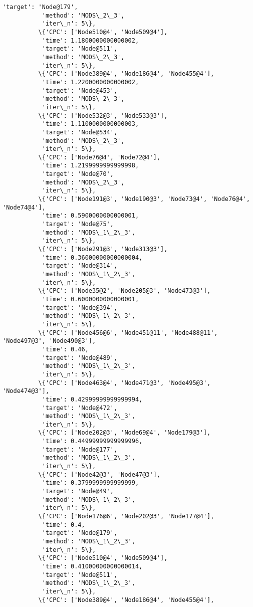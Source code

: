 \documentclass[11pt]{article}
\begin{document}
\begin{Verbatim}[commandchars=\\\{\}]
           'target': 'Node@179',
           'method': 'MODS\_2\_3',
           'iter\_n': 5\},
          \{'CPC': ['Node510@4', 'Node509@4'],
           'time': 1.1800000000000002,
           'target': 'Node@511',
           'method': 'MODS\_2\_3',
           'iter\_n': 5\},
          \{'CPC': ['Node389@4', 'Node186@4', 'Node455@4'],
           'time': 1.2200000000000002,
           'target': 'Node@453',
           'method': 'MODS\_2\_3',
           'iter\_n': 5\},
          \{'CPC': ['Node532@3', 'Node533@3'],
           'time': 1.1100000000000003,
           'target': 'Node@534',
           'method': 'MODS\_2\_3',
           'iter\_n': 5\},
          \{'CPC': ['Node76@4', 'Node72@4'],
           'time': 1.2199999999999998,
           'target': 'Node@70',
           'method': 'MODS\_2\_3',
           'iter\_n': 5\},
          \{'CPC': ['Node191@3', 'Node190@3', 'Node73@4', 'Node76@4', 'Node74@4'],
           'time': 0.5900000000000001,
           'target': 'Node@75',
           'method': 'MODS\_1\_2\_3',
           'iter\_n': 5\},
          \{'CPC': ['Node291@3', 'Node313@3'],
           'time': 0.36000000000000004,
           'target': 'Node@314',
           'method': 'MODS\_1\_2\_3',
           'iter\_n': 5\},
          \{'CPC': ['Node35@2', 'Node205@3', 'Node473@3'],
           'time': 0.6000000000000001,
           'target': 'Node@394',
           'method': 'MODS\_1\_2\_3',
           'iter\_n': 5\},
          \{'CPC': ['Node456@6', 'Node451@11', 'Node488@11', 'Node497@3', 'Node490@3'],
           'time': 0.46,
           'target': 'Node@489',
           'method': 'MODS\_1\_2\_3',
           'iter\_n': 5\},
          \{'CPC': ['Node463@4', 'Node471@3', 'Node495@3', 'Node474@3'],
           'time': 0.42999999999999994,
           'target': 'Node@472',
           'method': 'MODS\_1\_2\_3',
           'iter\_n': 5\},
          \{'CPC': ['Node202@3', 'Node69@4', 'Node179@3'],
           'time': 0.44999999999999996,
           'target': 'Node@177',
           'method': 'MODS\_1\_2\_3',
           'iter\_n': 5\},
          \{'CPC': ['Node42@3', 'Node47@3'],
           'time': 0.3799999999999999,
           'target': 'Node@49',
           'method': 'MODS\_1\_2\_3',
           'iter\_n': 5\},
          \{'CPC': ['Node176@6', 'Node202@3', 'Node177@4'],
           'time': 0.4,
           'target': 'Node@179',
           'method': 'MODS\_1\_2\_3',
           'iter\_n': 5\},
          \{'CPC': ['Node510@4', 'Node509@4'],
           'time': 0.41000000000000014,
           'target': 'Node@511',
           'method': 'MODS\_1\_2\_3',
           'iter\_n': 5\},
          \{'CPC': ['Node389@4', 'Node186@4', 'Node455@4'],

\end{Verbatim}
\end{document}
